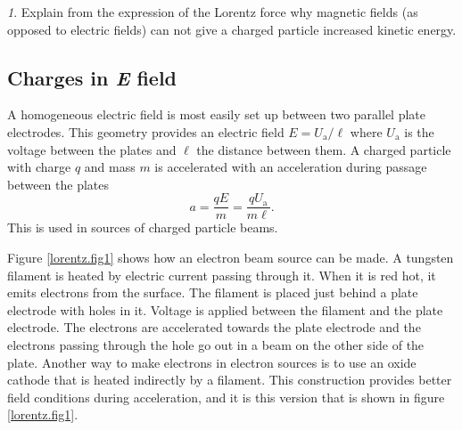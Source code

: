 \documentclass[../Elmag-labhefte-2020.tex]{subfiles}
\begin{document}
{\emph 1. Explain from the expression of the Lorentz force why magnetic fields (as opposed to electric fields) can not give a charged particle increased kinetic energy.}

\subsection{Charges in \textsl{E} field}

A homogeneous electric field is most easily set up between two parallel plate electrodes. This geometry provides an electric field $E = U_\mathrm{a}/\ell$ where $U_\mathrm{a}$ is the voltage between the plates and $\ell$ the distance between them. A charged particle with charge $q$ and mass $m$ is accelerated with an acceleration during passage between the plates
\begin{equation}
    a = \frac{q E}{m} = \frac{q U_\mathrm{a}}{m\ell}.
    \label{eq:lorentz.aksel}
\end{equation}
%
This is used in sources of charged particle beams.

Figure \ref{lorentz.fig1} shows how an electron beam source can be made. A tungsten filament is heated by electric current passing through it. When it is red hot, it emits electrons from the surface. The filament is placed just behind a plate electrode with holes in it. Voltage is applied between the filament and the plate electrode. The electrons are accelerated towards the plate electrode and the electrons passing through the hole go out in a beam on the other side of the plate. Another way to make electrons in electron sources is to use an oxide cathode that is heated indirectly by a filament. This construction provides better field conditions during acceleration, and it is this version that is shown in figure \ref{lorentz.fig1}.
%
\end{document}
